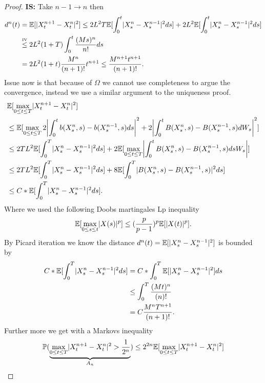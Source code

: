 \begin{proof}
  \textbf{IS:} Take $n-1 \to n$ then 
  \begin{align*}
    d^{n}(t) &= \E[\abs{X_t^{n+1} - X^{n}_t }^2] \le  2 L^2 T \E[\int_0^{t} \abs{X_s^{n} - X_s^{n-1}  }^2 ds ]  + 2L^2\E[\int_0^{t} \abs{X_s^{n} - X_s^{n-1}  }^2  ds] \\
             &\myS{IV}{\le } 2L^2(1+T) \int_0^{t} \frac{(Ms)^n}{n!} ds \\
             &= 2L^2(1+t) \frac{M^n}{(n+1)!} t^{n+1} \le \frac{M^{n+1}t^{n+1}}{(n+1)!} 
  .\end{align*}
  Issue now is that because of $\Omega $ we cannot use completeness to argue the convergence, instead
  we use a similar argument to the uniqueness proof. 
  \begin{align*}
    &\E[\max_{0\le t \le T} \abs{X^{n+1}_t - X^{n}_t  }^2] \\
    &\le \E[\max_{0\le t\le T} 2\abs*{\int_0^{t} b(X_s^{n},s )-b(X_s^{n-1},s ) ds}^2 + 2\abs*{\int_0^{t}B(X_s^{n},s )-B(X_s^{n-1},s ) dW_s}^2] \\
    &\le 2TL^2 \E[\int_0^{T} \abs{X_s^{n} - X_s^{n-1}  }^2 ds ] + 2\E[\max_{0\le t\le T} \abs*{\int_0^{t} B(X_s^{n},s )- B(X_s^{n-1},s ) ds W_s}]\\
    &\le  2TL^2 \E[\int_0^{T} \abs{X_s^{n} - X_s^{n-1}  }^2 ds ] + 8\E[\int_0^{T} \abs{B(X_s^{n},s  )-B(X_s^{n-1},s )}^2 ds ]\\
    &\le C*\E[\int_0^{T} \abs{X_s^{n}-X_s^{n-1}  }^2 ds ]
  .\end{align*}
  Where we used the following Doobs martingales Lp inequality 
  \begin{align*}
    \mathbb{E}[\max_{0\le s\le t} \lvert X(s)\rvert^{p} ] \le  (\frac{p}{p-1})^{p} \mathbb{E}[\lvert X(t)\rvert^{p}  ] 
  .\end{align*}
  By Picard iteration we know the distance $d^{n}(t) = \mathbb{E}[\lvert X_s^{n}-X_s^{n-1}  \rvert^2] $ is bounded by 
  \begin{align*}
    C*\mathbb{E}[\int_0^{T} \lvert X_s^{n}-X_s^{n-1}  \rvert^2 ds ] &= C* \int_0^{T} \mathbb{E}[\lvert X_s^{n} - X_s^{n-1}  \rvert^2] ds \\
                                                     &\le \int_0^{T} \frac{(Mt)^{n} }{(n)!} \\
                                                     &= C \frac{M^{n} T^{n+1} }{(n+1)!}
  .\end{align*}
  Further more we get with a Markovs inequality
  \begin{align*}
    \P(\underbrace{\max_{0\le t\le T} \abs{X_t^{n+1}-X_t^n}^2 > \frac{1}{2^{n} }}_{A_n}) &\le 2^{2n} \E[\max_{0\le t\le T} \abs{X_t^{n+1}-X_t^n}^2]\\

\end{align*}
\end{proof}
